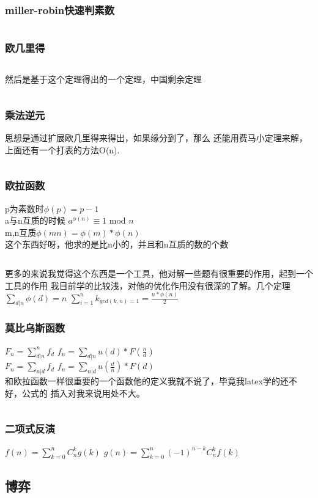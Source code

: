 \documentclass[a4paper,13.6pt]{article}
\begin{document}
\begin{CJK}{UTF8}{gbsn}
\subsubsection{miller-robin快速判素数}
\inputminted{c++}{../scoure/math/miller_robin.cpp}
\subsubsection{欧几里得}
\inputminted{c++}{../scoure/math/GCD.cpp}
然后是基于这个定理得出的一个定理，中国剩余定理
\inputminted{c++}{../scoure/math/chineseshengyu.cpp}
\subsubsection{乘法逆元}
思想是通过扩展欧几里得来得出，如果缘分到了，那么
还能用费马小定理来解，上面还有一个打表的方法O(n).
\inputminted{c++}{../scoure/math/niyuan.cpp}
\subsubsection{欧拉函数}
p为素数时$\phi(p) = p-1 $\\
a与n互质的时候 $a^{\phi(n)}\equiv 1$ mod $ n$\\
m,n互质$\phi(mn) = \phi(m) * \phi(n)$\\

这个东西好呀，他求的是比n小的，并且和n互质的数的个数
\inputminted{c++}{../scoure/math/oula.cpp}
更多的来说我觉得这个东西是一个工具，他对解一些题有很重要的作用，起到一个工具的作用
我目前学的比较浅，对他的优化作用没有很深的了解。几个定理\\
$\sum_{d|n}\phi(d) = n$ \qquad $\sum_{i=1}^n k_{gcd(k,n) = 1} = \frac{n*\phi(n)}{2}$
\subsubsection{莫比乌斯函数}
$F_n = \sum_{d|n}^n f_d$
$f_n = \sum_{d|n} u(d)*F(\frac{n}{d})$\\
$F_n = \sum_{n|d} f_d$
$f_n = \sum_{n|d} u(\frac{d}{n})*F(d)$\\
和欧拉函数一样很重要的一个函数他的定义我就不说了，毕竟我latex学的还不好，公式的
插入对我来说用处不大。
\inputminted{c++}{../scoure/math/mobius.cpp}
\subsubsection{二项式反演}
$f(n) = \sum_{k=0}^n C_n^k g(k)$
$g(n) = \sum_{k=0}^n (-1)^{n-k} C_n^k f(k)$
\newpage
\subsection{博弈}

\end{CJK}
\end{document}
